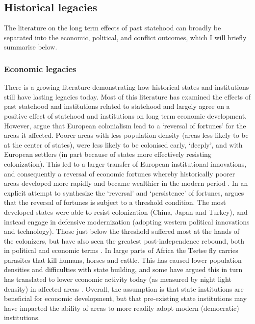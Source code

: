\subsection{Historical legacies} \label{Historical legacies}

The literature on the long term effects of past statehood can broadly be
separated into the economic, political, and conflict outcomes, which I will
briefly summarise below.

\subsubsection{Economic legacies} \label{Economic legacies}

There is a growing literature demonstrating how historical states and
institutions still have lasting legacies today. Most of this literature has
examined the effects of past statehood \citep{Bockstette2002, Borcan2018} and
institutions related to statehood \citep{Michalopoulos2013, Michalopoulos2018,
Englebert2000} and largely agree on a positive effect of statehood and
institutions \citep{Nunn_2020, Michalopoulos2016} on long term economic
development. However, \citet{Acemoglu_2002} argue that European colonialism lead
to a `reversal  of fortunes' for the areas it affected. Poorer areas with less
population density (areas less likely to be at the center of states), were less
likely to be colonised early, `deeply', and with European settlers (in part
because of states more effectively resisting colonization). This led to a larger
transfer of European institutional innovations, and consequently a reversal of
economic fortunes whereby historically poorer areas developed more rapidly and
became wealthier in the modern period \citep{Acemoglu_2002}. In an explicit
attempt to synthesize the `reversal' and `persistence' of fortunes,
\citep{Foa_2017} argues that the reversal of fortunes is subject to a threshold
condition. The most developed states were able to resist colonization (China,
Japan and Turkey), and instead engage in defensive modernization (adopting
western political innovations and technology). Those just below the threshold
suffered most at the hands of the colonizers, but have also seen the greatest
post-independence rebound, both in political and economic terms
\citep{Foa_2017}. In large parts of Africa the Tsetse fly carries parasites that
kill humans, horses and cattle. This has caused lower population densities and
difficulties with state building, and some have argued this in turn has
translated to lower economic activity today (as measured by night light density)
in affected areas \citep{Alsan_2015}. Overall, the assumption is that state
institutions are beneficial for economic development, but that pre-existing
state institutions may have impacted the ability of areas to more readily adopt
modern (democratic) institutions.

